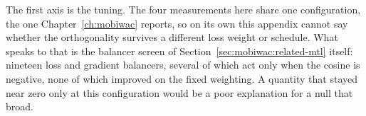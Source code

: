 The first axis is the tuning. The four measurements here share one configuration, the one
Chapter~\ref{ch:mobiwac} reports, so on its own this appendix cannot say whether the orthogonality
survives a different loss weight or schedule. What speaks to that is the balancer screen of
Section~\ref{sec:mobiwac:related-mtl} itself: nineteen loss and gradient balancers, several of
which act only when the cosine is negative, none of which improved on the fixed weighting. A
quantity that stayed near zero only at this configuration would be a poor explanation for a null
that broad.

